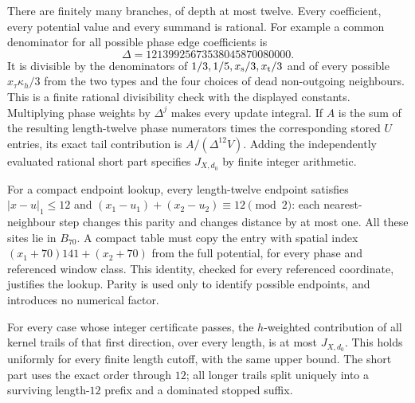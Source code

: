 There are finitely many branches, of depth at most twelve.
Every coefficient, every potential value and every summand is
rational. For example a common denominator for all possible phase
edge coefficients is
\[
 \Delta=12139925673538045870080000.
\]
It is divisible by the denominators of \(1/3,1/5,x_{\rm s}/3,
x_{\rm t}/3\) and of every possible
\(x_\tau\kappa_h/3\) from the two types and the four choices of
dead non-outgoing neighbours. This is a finite rational divisibility
check with the displayed constants. Multiplying phase weights by
\(\Delta^j\) makes every update integral. If \(A\) is the sum
of the resulting length-twelve phase numerators times the
corresponding stored \(U\) entries, its exact tail contribution is
\(A/(\Delta^{12}V)\). Adding the independently evaluated rational
short part specifies \(J_{X,d_0}\) by finite integer arithmetic.

For a compact endpoint lookup, every length-twelve endpoint satisfies
\(|x-u|_1\le12\) and
\((x_1-u_1)+(x_2-u_2)\equiv12\pmod2\): each nearest-neighbour
step changes this parity and changes distance by at most one.
All these sites lie in \(B_{70}\). A compact table must copy the
entry with spatial index
\((x_1+70)141+(x_2+70)\) from the full potential, for every phase
and referenced window class. This identity, checked for every
referenced coordinate, justifies the lookup. Parity is used only
to identify possible endpoints, and introduces no numerical factor.

\begin{lemma}\label{l:prefix-domination}
For every case whose integer certificate passes, the \(h\)-weighted
contribution of all kernel trails of that first direction,
over every length, is at most \(J_{X,d_0}\).
This holds uniformly for every finite length cutoff, with the same
upper bound. The short part uses the exact order through \(12\);
all longer trails split uniquely into a surviving length-\(12\)
prefix and a dominated stopped suffix.
\end{lemma}

